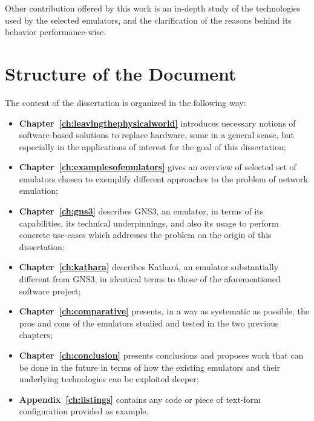 Other contribution offered by this work is an in-depth study of the technologies used by the selected emulators, and the clarification of the reasons behind its behavior performance-wise.

\section{Structure of the Document}
\label{sec:structure}

The content of the dissertation is organized in the following way:
\begin{itemize}
  \item \textbf{Chapter~\ref{ch:leavingthephysicalworld}} introduces necessary notions of software-based solutions to replace hardware, some in a general sense, but especially in the applications of interest for the goal of this dissertation;
  \item \textbf{Chapter~\ref{ch:examplesofemulators}} gives an overview of selected set of emulators chosen to exemplify different approaches to the problem of network emulation;
  \item \textbf{Chapter~\ref{ch:gns3}} describes GNS3, an emulator, in terms of its capabilities, its technical underpinnings, and also its usage to perform concrete use-cases which addresses the problem on the origin of this dissertation;
  \item \textbf{Chapter~\ref{ch:kathara}} describes Kathará, an emulator substantially different from GNS3, in identical terms to those of the aforementioned software project;
  \item \textbf{Chapter~\ref{ch:comparative}} presents, in a way as systematic as possible, the pros and cons of the emulators studied and tested in the two previous chapters;
  \item \textbf{Chapter~\ref{ch:conclusion}} presents conclusions and proposes work that can be done in the future in terms of how the existing emulators and their underlying technologies can be exploited deeper;
  \item \textbf{Appendix~\ref{ch:listings}} contains any code or piece of text-form configuration provided as example.
\end{itemize}

